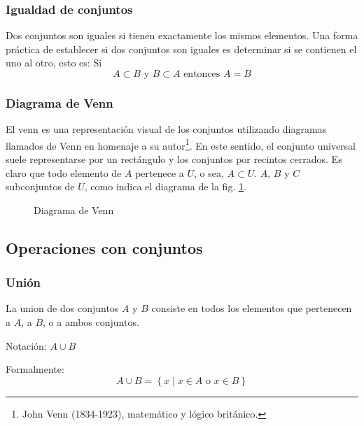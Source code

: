 \subsubsection{Igualdad de conjuntos}
\vspace{1em}
\begin{fmd-definition} \label{def:igualdad_conjuntos}
	Dos conjuntos son iguales si tienen exactamente los mismos elementos. Una forma práctica de establecer si dos conjuntos son iguales es determinar si se contienen el uno al otro, esto es:
	Si \[ A \subset B \mbox{ y } B \subset A \mbox{ entonces } A = B \]
\end{fmd-definition}

\subsubsection{Diagrama de Venn}

El \gls{venn} es una representación visual de los conjuntos utilizando diagramas llamados de Venn en homenaje a su autor\footnote{John Venn (1834-1923), matemático y lógico británico.}. En este sentido, el conjunto universal suele representarse por un rectángulo y los conjuntos por recintos cerrados. Es claro que todo elemento de $A$ pertenece a $U$, o sea, $A \subset U$. $A$, $B$ y $C$ subconjuntos de $U$, como indica el diagrama de la fig. \ref{fig:Venn}.

\begin{figure}[H]
	\centering
	\caption{Diagrama de Venn}
	\label{fig:Venn}
\end{figure}

\subsection{Operaciones con conjuntos}

\subsubsection{Unión }
\vspace{1em} 
\begin{fmd-definition}[Unión]
	La \gls{union} de dos conjuntos \(A\) y \(B\) consiste en todos los elementos que pertenecen a \(A\), a \(B\), o a ambos conjuntos.
	
	Notación: \(A \cup B\)
	
	Formalmente:
	\[ A \cup B = \left\{ x \mid x \in A \mbox{ o } x \in B \right\} \]
\end{fmd-definition}

